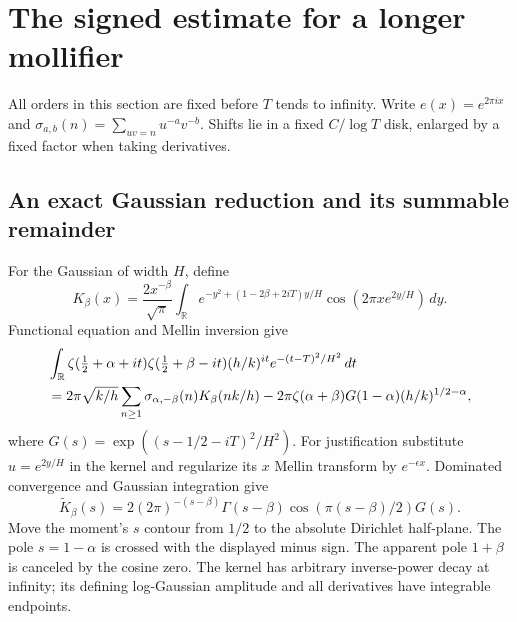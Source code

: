 \documentclass[11pt]{article}
\theoremstyle{remark}
\newcommand{\R}{\mathbb R}
\begin{document}
\section{The signed estimate for a longer mollifier}\label{sec:signed}

All orders in this section are fixed before $T$ tends to infinity.
Write $e(x)=e^{2\pi ix}$ and
$\sigma_{a,b}(n)=\sum_{uv=n}u^{-a}v^{-b}$. Shifts lie in a fixed
$C/\log T$ disk, enlarged by a fixed factor when taking derivatives.

\subsection{An exact Gaussian reduction and its summable remainder}
For the Gaussian of width $H$, define
\[
 K_\beta(x)=\frac{2x^{-\beta}}{\sqrt\pi}
 \int_\R e^{-y^2+(1-2\beta+2iT)y/H}
             \cos(2\pi x e^{2y/H})\,dy.
\]
Functional equation and Mellin inversion give
\begin{align}\label{eq:exactGaussian}
 &\int_\R\zeta(\tfrac12+\alpha+it)\zeta(\tfrac12+\beta-it)
      (h/k)^{it}e^{-(t-T)^2/H^2}\,dt\notag\\
 &=2\pi\sqrt{k/h}\sum_{n\ge1}\sigma_{\alpha,-\beta}(n)K_\beta(nk/h)
   -2\pi\zeta(\alpha+\beta)G(1-\alpha)(h/k)^{1/2-\alpha},
\end{align}
where $G(s)=\exp((s-1/2-iT)^2/H^2)$. For justification substitute
$u=e^{2y/H}$ in the kernel and regularize its $x$ Mellin transform by
$e^{-\epsilon x}$. Dominated convergence and Gaussian integration give
\[
 \widetilde K_\beta(s)=2(2\pi)^{-(s-\beta)}
       \Gamma(s-\beta)\cos(\pi(s-\beta)/2)G(s).
\]
Move the moment's $s$ contour from $1/2$ to the absolute Dirichlet
half-plane. The pole $s=1-\alpha$ is crossed with the displayed minus
sign. The apparent pole $1+\beta$ is canceled by the cosine zero.
The kernel has arbitrary inverse-power decay at infinity; its defining
log-Gaussian amplitude and all derivatives have integrable endpoints.
\end{document}
